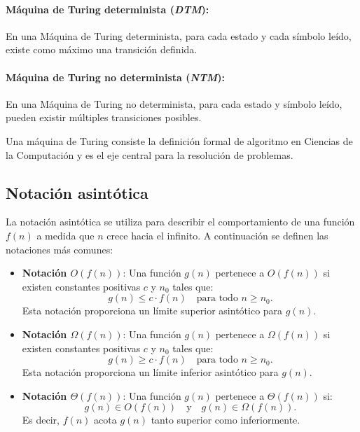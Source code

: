 \documentclass{article}
\begin{document}
\paragraph{Máquina de Turing determinista (\textit{DTM}):}
En una Máquina de Turing determinista, para cada estado y cada símbolo leído, existe como máximo una transición
definida.
\paragraph{Máquina de Turing no determinista (\textit{NTM}):}
En una Máquina de Turing no determinista, para cada estado y símbolo leído, pueden existir múltiples
transiciones posibles.

Una máquina de Turing consiste la definición formal de algoritmo en Ciencias de la Computación y es el eje central para la resolución de problemas.

\subsection{Notación asintótica}

La notación asintótica se utiliza para describir el comportamiento de una función $f(n)$ a medida que $n$ crece hacia el infinito. A continuación se definen las notaciones más comunes:

\begin{itemize}
      \item \textbf{Notación $O(f(n))$}: Una función $g(n)$ pertenece a $O(f(n))$ si existen constantes positivas $c$ y $n_0$ tales que:
            \[
                  g(n) \leq c \cdot f(n) \quad \text{para todo } n \geq n_0.
            \]
            Esta notación proporciona un límite superior asintótico para $g(n)$.

      \item \textbf{Notación $\Omega(f(n))$}: Una función $g(n)$ pertenece a $\Omega(f(n))$ si existen constantes positivas $c$ y $n_0$ tales que:
            \[
                  g(n) \geq c \cdot f(n) \quad \text{para todo } n \geq n_0.
            \]
            Esta notación proporciona un límite inferior asintótico para $g(n)$.

      \item \textbf{Notación $\Theta(f(n))$}: Una función $g(n)$ pertenece a $\Theta(f(n))$ si:
            \[
                  g(n) \in O(f(n)) \quad \text{y} \quad g(n) \in \Omega(f(n)).
            \]
            Es decir, $f(n)$ acota $g(n)$ tanto superior como inferiormente.
\end{itemize}
\end{document}
